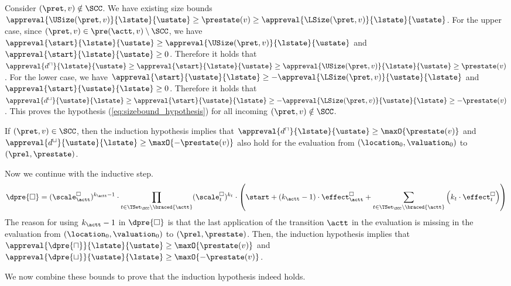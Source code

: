 Consider $(\pret, v) \notin \SCC$.
We have existing size bounds $\appreval{\USize(\pret, v)}{\lstate}{\ustate} \geq \prestate(v) \geq \appreval{\LSize(\pret, v)}{\lstate}{\ustate}$.
For the upper case, since $(\pret, v) \in \pre(\actt, v) \setminus \SCC$, we have $\appreval{\start}{\lstate}{\ustate} \geq \appreval{\USize(\pret, v)}{\lstate}{\ustate}$ and $\appreval{\start}{\lstate}{\ustate} \geq 0$.
Therefore it holds that $\appreval{d^\sqcap}{\lstate}{\ustate} \geq \appreval{\start}{\lstate}{\ustate} \geq \appreval{\USize(\pret, v)}{\lstate}{\ustate} \geq \prestate(v)$.
For the lower case, we have $\appreval{\start}{\ustate}{\lstate} \geq -\appreval{\LSize(\pret, v)}{\ustate}{\lstate}$ and $\appreval{\start}{\ustate}{\lstate} \geq 0$.
Therefore it holds that $\appreval{d^\sqcup}{\ustate}{\lstate} \geq \appreval{\start}{\ustate}{\lstate} \geq -\appreval{\LSize(\pret, v)}{\ustate}{\lstate} \geq -\prestate(v)$.
This proves the hypothesis (\ref{eq:sizebound_hypothesis}) for all incoming $(\pret, v) \notin \SCC$.

If $(\pret, v) \in \SCC$, then the induction hypothesis implies that $\appreval{d^\sqcap}{\lstate}{\ustate} \geq \maxO{\prestate(v)}$ and $\appreval{d^\sqcup}{\ustate}{\lstate} \geq \maxO{-\prestate(v)}$ also hold for the evaluation from $(\location_0, \valuation_0)$ to $(\prel, \prestate)$.

Now we continue with the inductive step.
\begin{equation} \label{eq:induction_consequence}
  \dpre{\square} = (\scale^\square_\actt)^{k_\actt - 1} \cdot \prod_{t \in \TSet_\SCC \setminus \braced{\actt}} (\scale^\square_t)^{k_t} \cdot \left( \start + \left( k_\actt - 1 \right) \cdot \effect^\square_\actt + \sum_{t \in \TSet_\SCC \setminus \braced{\actt}} \left( k_t \cdot \effect^\square_t \right) \right)
\end{equation}
The reason for using $k_\actt - 1$ in $\dpre{\square}$ is that the last application of the transition $\actt$ in the evaluation is missing in the evaluation from $(\location_0, \valuation_0)$ to $(\prel, \prestate)$.
Then, the induction hypothesis implies that $\appreval{\dpre{\sqcap}}{\lstate}{\ustate} \geq \maxO{\prestate(v)}$ and $\appreval{\dpre{\sqcup}}{\ustate}{\lstate} \geq \maxO{-\prestate(v)}$.

We now combine these bounds to prove that the induction hypothesis indeed holds.

